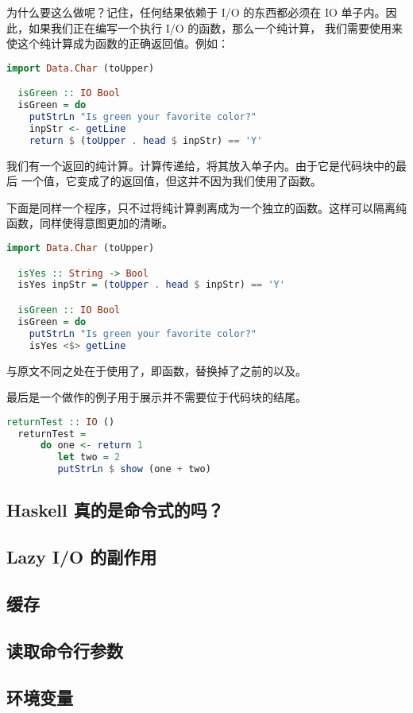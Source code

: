 \documentclass[./main.tex]{subfiles}
\begin{document}
为什么要这么做呢？记住，任何结果依赖于 I/O 的东西都必须在 IO 单子内。因此，如果我们正在编写一个执行 I/O 的函数，那么一个纯计算，
我们需要使用来使这个纯计算成为函数的正确返回值。例如：

\begin{lstlisting}[language=Haskell]
  import Data.Char (toUpper)

  isGreen :: IO Bool
  isGreen = do
    putStrLn "Is green your favorite color?"
    inpStr <- getLine
    return $ (toUpper . head $ inpStr) == 'Y'
\end{lstlisting}

我们有一个返回的纯计算。计算传递给，将其放入单子内。由于它是代码块中的最后
一个值，它变成了的返回值，但这并不因为我们使用了函数。

下面是同样一个程序，只不过将纯计算剥离成为一个独立的函数。这样可以隔离纯函数，同样使得意图更加的清晰。

\begin{lstlisting}[language=Haskell]
  import Data.Char (toUpper)

  isYes :: String -> Bool
  isYes inpStr = (toUpper . head $ inpStr) == 'Y'

  isGreen :: IO Bool
  isGreen = do
    putStrLn "Is green your favorite color?"
    isYes <$> getLine
\end{lstlisting}

与原文不同之处在于使用了\acode{<\$>}，即函数，替换掉了之前的以及。

最后是一个做作的例子用于展示并不需要位于代码块的结尾。

\begin{lstlisting}[language=Haskell]
  returnTest :: IO ()
  returnTest =
      do one <- return 1
         let two = 2
         putStrLn $ show (one + two)
\end{lstlisting}

\subsection*{Haskell 真的是命令式的吗？}

\subsection*{Lazy I/O 的副作用}

\subsection*{缓存}

\subsection*{读取命令行参数}

\subsection*{环境变量}


\end{document}
